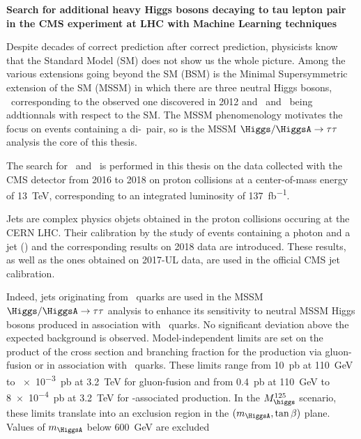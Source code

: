\begin{center}
\LARGE
\bf
\sffamily
Search for additional heavy Higgs bosons decaying to tau lepton pair in the CMS experiment at LHC with Machine Learning techniques
\end{center}

\vspace{2\baselineskip}

Despite decades of correct prediction after correct prediction,
physicists know that the Standard Model (SM) does not show us the whole picture.
Among the various extensions going beyond the SM (BSM)
is the
Minimal Supersymmetric extension of the SM (MSSM)
in which
there are three neutral Higgs bosons,
\higgs\ corresponding to the observed one discovered in 2012
and
\Higgs\ and \HiggsA\ being addtionnals with respect to the SM.
The MSSM phenomenology motivates the focus on events containing a di-\tau\ pair,
so is the MSSM $\Higgs/\HiggsA\to\tau\tau$ analysis the core of this thesis.
\par
The search
for \Higgs\ and \HiggsA\ 
is performed
in this thesis
on the data collected
with the CMS detector from 2016 to 2018
on proton collisions
at a center-of-mass energy of \SI{13}{\TeV},
corresponding to an integrated luminosity of \SI{137}{\femto\barn^{-1}}.
\par
Jets are complex physics objets
obtained
in the proton collisions occuring at the CERN LHC.
Their calibration by
the study of events containing a photon and a jet (\Gjet)
and the corresponding results on 2018 data
are introduced.
These results,
as well as the ones obtained on 2017-UL data,
are used in the official CMS jet calibration.
\par
Indeed,
jets originating from \quarkb~quarks are used in the MSSM $\Higgs/\HiggsA\to\tau\tau$ analysis
to enhance its sensitivity to neutral MSSM Higgs bosons
produced in association with \quarkb~quarks.
No significant deviation above the expected background is observed.
Model-independent limits are set
on the product of the cross section and branching fraction
for the production
via gluon-fusion
or
in association with \quarkb~quarks.
These limits range
from
\SI{10}{\pico\barn} at \SI{110}{\GeV}
to
\SI{e-3}{\pico\barn} at \SI{3.2}{\TeV}
for gluon-fusion
and from
\SI{0.4}{\pico\barn} at \SI{110}{\GeV}
to
\SI{8e-4}{\pico\barn} at \SI{3.2}{\TeV}
for \quarkb-associated production.
In the $M_{\higgs}^{125}$ scenario,
these limits translate into
an exclusion region in the $(m_{\HiggsA},\tan\beta)$ plane.
Values of $m_{\HiggsA}$ below \SI{600}{\GeV} are excluded
